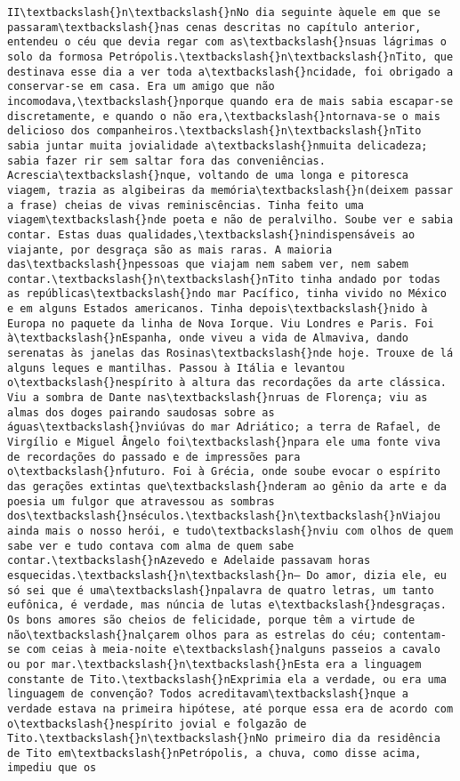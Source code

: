 \begin{Verbatim}[commandchars=\\\{\}]
II\textbackslash{}n\textbackslash{}nNo dia seguinte àquele em que se passaram\textbackslash{}nas cenas descritas no capítulo anterior, entendeu o céu que devia regar com as\textbackslash{}nsuas lágrimas o solo da formosa Petrópolis.\textbackslash{}n\textbackslash{}nTito, que destinava esse dia a ver toda a\textbackslash{}ncidade, foi obrigado a conservar-se em casa. Era um amigo que não incomodava,\textbackslash{}nporque quando era de mais sabia escapar-se discretamente, e quando o não era,\textbackslash{}ntornava-se o mais delicioso dos companheiros.\textbackslash{}n\textbackslash{}nTito sabia juntar muita jovialidade a\textbackslash{}nmuita delicadeza; sabia fazer rir sem saltar fora das conveniências. Acrescia\textbackslash{}nque, voltando de uma longa e pitoresca viagem, trazia as algibeiras da memória\textbackslash{}n(deixem passar a frase) cheias de vivas reminiscências. Tinha feito uma viagem\textbackslash{}nde poeta e não de peralvilho. Soube ver e sabia contar. Estas duas qualidades,\textbackslash{}nindispensáveis ao viajante, por desgraça são as mais raras. A maioria das\textbackslash{}npessoas que viajam nem sabem ver, nem sabem contar.\textbackslash{}n\textbackslash{}nTito tinha andado por todas as repúblicas\textbackslash{}ndo mar Pacífico, tinha vivido no México e em alguns Estados americanos. Tinha depois\textbackslash{}nido à Europa no paquete da linha de Nova Iorque. Viu Londres e Paris. Foi à\textbackslash{}nEspanha, onde viveu a vida de Almaviva, dando serenatas às janelas das Rosinas\textbackslash{}nde hoje. Trouxe de lá alguns leques e mantilhas. Passou à Itália e levantou o\textbackslash{}nespírito à altura das recordações da arte clássica. Viu a sombra de Dante nas\textbackslash{}nruas de Florença; viu as almas dos doges pairando saudosas sobre as águas\textbackslash{}nviúvas do mar Adriático; a terra de Rafael, de Virgílio e Miguel Ângelo foi\textbackslash{}npara ele uma fonte viva de recordações do passado e de impressões para o\textbackslash{}nfuturo. Foi à Grécia, onde soube evocar o espírito das gerações extintas que\textbackslash{}nderam ao gênio da arte e da poesia um fulgor que atravessou as sombras dos\textbackslash{}nséculos.\textbackslash{}n\textbackslash{}nViajou ainda mais o nosso herói, e tudo\textbackslash{}nviu com olhos de quem sabe ver e tudo contava com alma de quem sabe contar.\textbackslash{}nAzevedo e Adelaide passavam horas esquecidas.\textbackslash{}n\textbackslash{}n— Do amor, dizia ele, eu só sei que é uma\textbackslash{}npalavra de quatro letras, um tanto eufônica, é verdade, mas núncia de lutas e\textbackslash{}ndesgraças. Os bons amores são cheios de felicidade, porque têm a virtude de não\textbackslash{}nalçarem olhos para as estrelas do céu; contentam-se com ceias à meia-noite e\textbackslash{}nalguns passeios a cavalo ou por mar.\textbackslash{}n\textbackslash{}nEsta era a linguagem constante de Tito.\textbackslash{}nExprimia ela a verdade, ou era uma linguagem de convenção? Todos acreditavam\textbackslash{}nque a verdade estava na primeira hipótese, até porque essa era de acordo com o\textbackslash{}nespírito jovial e folgazão de Tito.\textbackslash{}n\textbackslash{}nNo primeiro dia da residência de Tito em\textbackslash{}nPetrópolis, a chuva, como disse acima, impediu que os 
\end{Verbatim}

